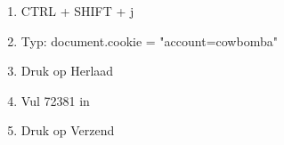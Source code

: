 \begin{enumerate}
  \item CTRL + SHIFT + j
  \item Typ: document.cookie = "account=cowbomba"
  \item Druk op Herlaad
  \item Vul 72381 in
  \item Druk op Verzend
\end{enumerate}